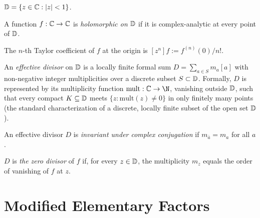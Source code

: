 \begin{definition}
  \label{def:disk}
  \leanok
  $\mathbb{D} = \{z \in \mathbb{C} : \left|z\right| < 1\}$.
\end{definition}

\begin{definition}[Holomorphic on $\D$]
  \label{def:holomorphicOn}
  \leanok
  A function $f : \mathbb{C} \to \mathbb{C}$ is \emph{holomorphic on $\D$} if it is
  complex-analytic at every point of $\D$.
\end{definition}

\begin{definition}
  \label{def:taylorCoeff}
  \leanok
  The $n$-th Taylor coefficient of $f$ at the origin is
  $[z^n]f := f^{(n)}(0)/n!$.
\end{definition}

\begin{definition}
  \label{def:divisor}
  \leanok
  An \emph{effective divisor} on $\D$ is a locally finite formal sum
  $D = \sum_{a \in S} m_a [a]$ with non-negative integer multiplicities
  over a discrete subset $S \subset \mathbb{D}$. Formally, $D$ is represented by
  its multiplicity function $\mathrm{mult} : \C \to \N$, vanishing outside
  $\D$, such that every compact $K \subseteq \mathbb{D}$ meets
  $\{z : \mathrm{mult}(z) \ne 0\}$ in only finitely many points (the
  standard characterization of a discrete, locally finite subset of the
  open set $\D$).
\end{definition}

\begin{definition}
  \label{def:conjInvariant}
  \leanok
  An effective divisor $D$ is \emph{invariant under complex conjugation}
  if $m_{\bar a} = m_a$ for all $a$.
\end{definition}

\begin{definition}
  \label{def:zeroDivisorOf}
  \leanok
  $D$ is \emph{the zero divisor} of $f$ if, for every $z \in \mathbb{D}$, the
  multiplicity $m_z$ equals the order of vanishing of $f$ at $z$.
\end{definition}

\chapter{Modified Elementary Factors}
\label{chap:factors}

